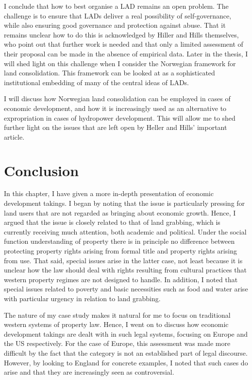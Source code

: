 I conclude that how to best organise a LAD remains an open problem. The challenge is to ensure that LADs deliver a real possibility of self-governance, while also ensuring good governance and protection against abuse. That it remains unclear how to do this is acknowledged by Hiller and Hills themselves, who point out that further work is needed and that only a limited assessment of their proposal can be made in the absence of empirical data. Later in the thesis, I will shed light on this challenge when I consider the Norwegian framework for land consolidation. This framework can be looked at as a sophisticated institutional embedding of many of the central ideas of LADs.

I will discuss how Norwegian land consolidation can be employed in cases of economic development, and how it is increasingly used as an alternative to expropriation in cases of hydropower development. This will allow me to shed further light on the issues that are left open by Heller and Hills' important article.

\section{Conclusion}\label{sec:conc2}

In this chapter, I have given a more in-depth presentation of economic development takings. I began by noting that the issue is particularly pressing for land users that are not regarded as bringing about economic growth. Hence, I argued that the issue is closely related to that of land grabbing, which is currently receiving much attention, both academic and political. Under the social function understanding of property there is in principle no difference between protecting property rights arising from formal title and property rights arising from use. That said, special issues arise in the latter case, not least because it is unclear how the law should deal with rights resulting from cultural practices that western property regimes are not designed to handle. In addition, I noted that special issues related to poverty and basic necessities such as food and water arise with particular urgency in relation to land grabbing.

The nature of my case study makes it natural for me to focus on traditional western systems of property law. Hence, I went on to discuss how economic development takings are dealt with in such legal systems, focusing on Europe and the US respectively. For the case of Europe, this assessment was made more difficult by the fact that the category is not an established part of legal discourse. However, by looking to England for concrete examples, I noted that such cases do arise and that they are increasingly seen as controversial.

